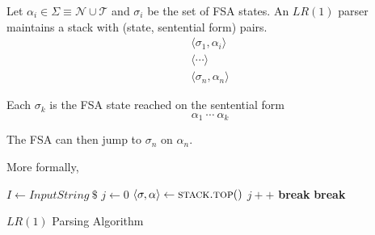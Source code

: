 \begin{definition}
    Let $\alpha_i \in \Sigma \equiv \mathcal{N} \cup \mathcal{T}$ and $\sigma_i$ be the set of FSA states. An $LR(1)$ parser maintains a stack with (state, sentential form) pairs.
    \begin{equation}
        \begin{gathered}
            \langle \sigma_1, \alpha_i \rangle \\
            \langle \cdots \rangle \\
            \langle \sigma_n, \alpha_n \rangle
        \end{gathered}
    \end{equation}
    
    Each $\sigma_k$ is the FSA state reached on the sentential form
    \begin{equation}
        \alpha_1\ \cdots\ \alpha_k
    \end{equation}
    
    The FSA can then jump to $\sigma_n$ on $\alpha_n$.
    
    More formally,
    \begin{algorithm}[H]
        \begin{algorithmic}[1]
                \State $I \gets InputString\ \$$ 
                \State $j \gets 0$ 
                \State {} 
                    \State $\langle \sigma, \alpha \rangle \gets \Call{stack.top}{\null}$
                            \State {}
                            \State $j{+}{+}$
                            \State \textbf{break}
                        \EndCase
                         
                                \State {}
                            \EndFor
                            \State {}
                            \State \textbf{break}
                        \EndCase
                            \State {}
                        \EndCase
                            \State {}
                        \EndCase
                    \EndSwitch
                \EndWhile
            \EndProcedure
        \end{algorithmic}
        \caption{$LR(1)$ Parsing Algorithm}
        \label{prog:lr1-parsing-algorithm}
    \end{algorithm}
\end{definition}

